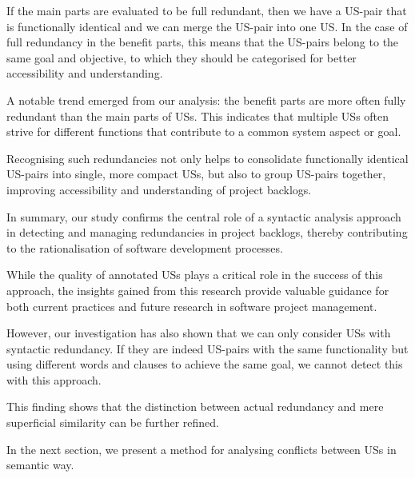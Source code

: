 If the main parts are evaluated to be full redundant, then we have a US-pair that is functionally identical and we can merge the US-pair into one US. In the case of full redundancy in the benefit parts, this means that the US-pairs belong to the same goal and objective, to which they should be categorised for better accessibility and understanding.
 
A notable trend emerged from our analysis: the benefit parts are more often fully redundant than the main parts of USs. This indicates that multiple USs often strive for different functions that contribute to a common system aspect or goal.

Recognising such redundancies not only helps to consolidate functionally identical US-pairs into single, more compact USs, but also to group US-pairs together, improving accessibility and understanding of project backlogs.

In summary, our study confirms the central role of a syntactic analysis approach in detecting and managing redundancies in project backlogs, thereby contributing to the rationalisation of software development processes.

While the quality of annotated USs plays a critical role in the success of this approach, the insights gained from this research provide valuable guidance for both current practices and future research in software project management.

However, our investigation has also shown that we can only consider USs with syntactic redundancy. If they are indeed US-pairs with the same functionality but using different words and clauses to achieve the same goal, we cannot detect this with this approach.

This finding shows that the distinction between actual redundancy and mere superficial similarity can be further refined.

In the next section, we present a method for analysing conflicts between USs in semantic way.

%
